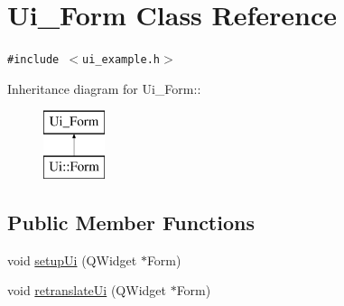 \hypertarget{classUi__Form}{
\section{Ui\_\-Form Class Reference}
\label{classUi__Form}
}
{\tt \#include $<$ui\_\-example.h$>$}

Inheritance diagram for Ui\_\-Form::\begin{figure}[H]
\begin{center}
\leavevmode
\includegraphics[height=2cm]{classUi__Form}
\end{center}
\end{figure}
\subsection*{Public Member Functions}
\begin{CompactItemize}
\item 
void \hyperlink{classUi__Form_90f69afe5c674331bdf041a051aee259}{setupUi} (QWidget $\ast$Form)
\item 
void \hyperlink{classUi__Form_d05dfdbcadce5efd8a7e8da759e41aa4}{retranslateUi} (QWidget $\ast$Form)
\end{CompactItemize}
